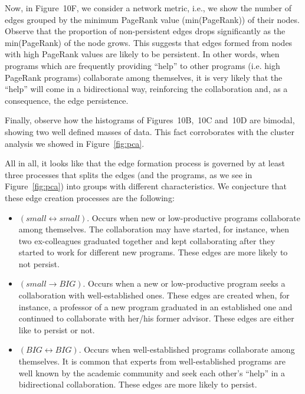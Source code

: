 \documentclass[10pt]{article}
\begin{document}
Now, in Figure~10F, we consider a network metric, i.e.,  we show the number of
edges grouped by the minimum PageRank value (min(PageRank)) of their nodes. Observe that the
proportion of non-persistent edges drops significantly as the min(PageRank) of the node grows. This
suggests that edges formed from nodes with high PageRank values are likely to be persistent.  In other words, when programs
which are frequently providing ``help'' to other programs (i.e. high PageRank programs) collaborate
among themselves, it is very likely that the ``help'' will come in a bidirectional way, reinforcing
the collaboration and, as a consequence, the edge persistence. 

Finally, observe how the histograms of Figures~10B,~10C
and~10D are bimodal, showing two well defined masses of data. This fact corroborates
with the cluster analysis we showed in Figure~\ref{fig:pca}. 

All in all, it looks like that the edge formation process is governed by at least three processes
that splits the edges (and the programs, as we see in Figure~\ref{fig:pca}) into groups with
different characteristics. We conjecture that these edge creation processes are the following:

\begin{itemize}
  \item $(small\leftrightarrow small)$. Occurs when new or low-productive programs collaborate among
      themselves. The collaboration may have started, for instance, when two ex-colleagues graduated
      together and kept collaborating after they started to work for different new programs. These
      edges are more likely to not persist.
  \item $(small\rightarrow BIG)$. Occurs when a new or low-productive program seeks a collaboration
      with well-established ones. These edges are created when, for instance, a professor of a new
      program graduated in an established one and continued to collaborate with her/his former
      advisor. These edges are either like to persist or not.
   \item $(BIG \leftrightarrow BIG)$. Occurs when well-established programs collaborate among
       themselves. It is common that experts from well-established programs are well known by the
       academic community and seek each other's ``help'' in a bidirectional collaboration. These
       edges are more likely to persist.
\end{itemize}
\end{document}

